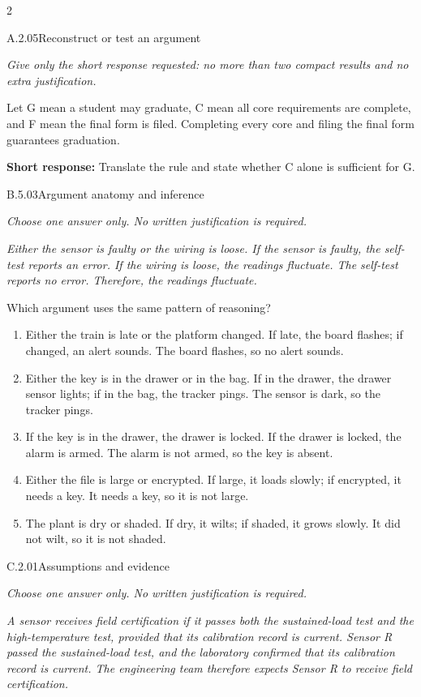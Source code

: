 \documentclass[9pt]{extarticle}
\newcommand{\choice}[1]{\item #1}
\begin{document}
\begin{multicols}{2}
\begin{DenseCoreProblem}{A.2.05}{Reconstruct or test an argument}
{\scriptsize\textit{Give only the short response requested: no more than two compact results and no extra justification.}\par}
Let G mean a student may graduate, C mean all core requirements are complete, and F mean the final form is filed. Completing every core and filing the final form guarantees graduation.

\textbf{Short response:} Translate the rule and state whether C alone is sufficient for G.
\end{DenseCoreProblem}
\begin{DenseCoreProblem}{B.5.03}{Argument anatomy and inference}
{\scriptsize\textit{Choose one answer only. No written justification is required.}\par}
\emph{Either the sensor is faulty or the wiring is loose. If the sensor is faulty, the self-test reports an error. If the wiring is loose, the readings fluctuate. The self-test reports no error. Therefore, the readings fluctuate.}

Which argument uses the same pattern of reasoning?
\begin{enumerate}[label=(\alph*)]
  \choice{Either the train is late or the platform changed. If late, the board flashes; if changed, an alert sounds. The board flashes, so no alert sounds.}
  \choice{Either the key is in the drawer or in the bag. If in the drawer, the drawer sensor lights; if in the bag, the tracker pings. The sensor is dark, so the tracker pings.}
  \choice{If the key is in the drawer, the drawer is locked. If the drawer is locked, the alarm is armed. The alarm is not armed, so the key is absent.}
  \choice{Either the file is large or encrypted. If large, it loads slowly; if encrypted, it needs a key. It needs a key, so it is not large.}
  \choice{The plant is dry or shaded. If dry, it wilts; if shaded, it grows slowly. It did not wilt, so it is not shaded.}
\end{enumerate}
\end{DenseCoreProblem}
\columnbreak
\begin{DenseCoreProblem}{C.2.01}{Assumptions and evidence}
{\scriptsize\textit{Choose one answer only. No written justification is required.}\par}
\emph{A sensor receives field certification if it passes both the sustained-load test and the high-temperature test, provided that its calibration record is current. Sensor R passed the sustained-load test, and the laboratory confirmed that its calibration record is current. The engineering team therefore expects Sensor R to receive field certification.}


\end{DenseCoreProblem}
\end{multicols}
\end{document}
